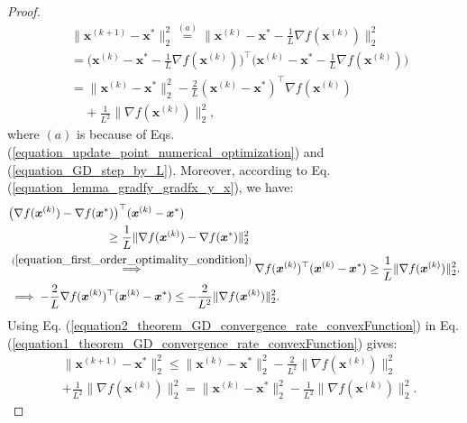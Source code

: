 \documentclass[lang=cn,10pt]{gorgeousnbook}
\numberwithin{equation}{section}%
\numberwithin{figure}{section}%
\begin{document}
\begin{proof}
\begin{align}
  &\|\boldsymbol{x}^{(k+1)} - \boldsymbol{x}^*\|_2^2 \overset{(a)}{=} \big\|\boldsymbol{x}^{(k)} - \boldsymbol{x}^* - \frac{1}{L} \nabla f(\boldsymbol{x}^{(k)})\big\|_2^2 \nonumber\\
  &=\! \big(\boldsymbol{x}^{(k)} - \boldsymbol{x}^* - \frac{1}{L} \nabla f(\boldsymbol{x}^{(k)})\big)^\top \big(\boldsymbol{x}^{(k)} - \boldsymbol{x}^* - \frac{1}{L} \nabla f(\boldsymbol{x}^{(k)})\big) \nonumber\\
  &= \|\boldsymbol{x}^{(k)} - \boldsymbol{x}^*\|_2^2 -\frac{2}{L} (\boldsymbol{x}^{(k)} - \boldsymbol{x}^*)^\top \nabla f(\boldsymbol{x}^{(k)}) \nonumber\\
  &~~~~~+ \frac{1}{L^2} \|\nabla f(\boldsymbol{x}^{(k)})\|_2^2, \label{equation1_theorem_GD_convergence_rate_convexFunction}
  \end{align}
  where $(a)$ is because of Eqs. (\ref{equation_update_point_numerical_optimization}) and (\ref{equation_GD_step_by_L}).
  Moreover, according to Eq. (\ref{equation_lemma_gradfy_gradfx_y_x}), we have:
  \begin{align}
  &\big( \nabla f(\boldsymbol{x}^{(k)}) - \nabla f(\boldsymbol{x}^*) \big)^\top (\boldsymbol{x}^{(k)} - \boldsymbol{x}^*) \nonumber\\
  &~~~~~~~~~~~~~~~~~~~~~~~~~\geq \frac{1}{L} \|\nabla f(\boldsymbol{x}^{(k)}) - \nabla f(\boldsymbol{x}^*)\|_2^2 \nonumber\\
  &\overset{(\ref{equation_first_order_optimality_condition})}{\implies} \nabla f(\boldsymbol{x}^{(k)})^\top (\boldsymbol{x}^{(k)} - \boldsymbol{x}^*) \geq \frac{1}{L} \|\nabla f(\boldsymbol{x}^{(k)})\|_2^2. \nonumber \\
  &\implies -\frac{2}{L}\nabla f(\boldsymbol{x}^{(k)})^\top (\boldsymbol{x}^{(k)} - \boldsymbol{x}^*) \leq -\frac{2}{L^2} \|\nabla f(\boldsymbol{x}^{(k)})\|_2^2. \label{equation2_theorem_GD_convergence_rate_convexFunction}
  \end{align}
  Using Eq. (\ref{equation2_theorem_GD_convergence_rate_convexFunction}) in Eq. (\ref{equation1_theorem_GD_convergence_rate_convexFunction}) gives:
  \begin{align*}
  &\|\boldsymbol{x}^{(k+1)} - \boldsymbol{x}^*\|_2^2 \leq \|\boldsymbol{x}^{(k)} - \boldsymbol{x}^*\|_2^2 -\frac{2}{L^2} \|\nabla f(\boldsymbol{x}^{(k)})\|_2^2 \\
  &+ \frac{1}{L^2} \|\nabla f(\boldsymbol{x}^{(k)})\|_2^2 = \|\boldsymbol{x}^{(k)} - \boldsymbol{x}^*\|_2^2 -\frac{1}{L^2} \|\nabla f(\boldsymbol{x}^{(k)})\|_2^2.

\end{align*}
\end{proof}
\end{document}
